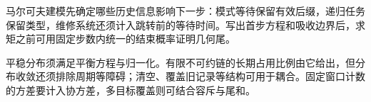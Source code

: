 马尔可夫建模先确定哪些历史信息影响下一步：模式等待保留有效后缀，递归任务保留类型，维修系统还须计入跳转前的等待时间。写出首步方程和吸收边界后，求矩之前可用固定步数内统一的结束概率证明几何尾。

平稳分布须满足平衡方程与归一化。有限不可约链的长期占用比例由它给出，但分布收敛还须排除周期等障碍；清空、覆盖旧记录等结构可用于耦合。固定窗口计数的方差要计入协方差，多目标覆盖则可结合容斥与尾和。
\par\smallskip
